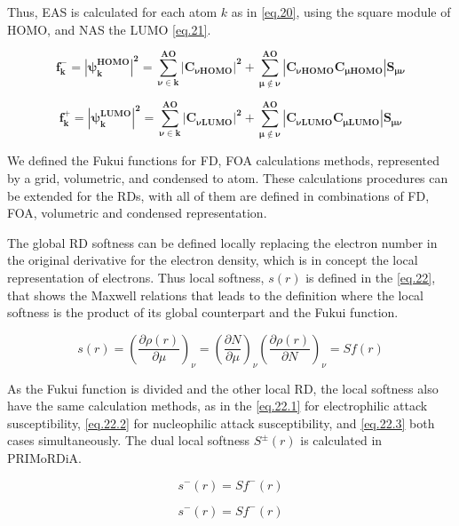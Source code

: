 \documentclass[a4paper,11pt]{refart}
\begin{document}
Thus, EAS is calculated for each atom $k$ as in \autoref{eq.20}, using the square module of HOMO, and NAS the LUMO \autoref{eq.21}. 

\begin{equation}
\mathbf{f^-_k =|\psi^{HOMO}_k|^2 =  \sum_{\nu \in k}^{AO} |C_{\nu HOMO}|^{2} + \sum_{\mu \notin \nu }^{AO} |C_{\nu HOMO} C_{\mu HOMO}|S_{\mu \nu}}
\label{eq.20}
\end{equation}

\begin{equation}
\mathbf{f^+_k = |\psi^{LUMO}_k|^2 = \sum_{\nu \in k}^{AO} |C_{\nu LUMO}|^{2} + \sum_{\mu \notin \nu }^{AO} |C_{\nu LUMO} C_{\mu LUMO}|S_{\mu \nu} }
\label{eq.21}
\end{equation}

We defined the Fukui functions for FD, FOA calculations methods, represented by a grid, volumetric, and condensed to atom. These calculations procedures can be extended for the RDs, with all of them are defined in combinations of FD, FOA, volumetric and condensed representation.   


The global RD softness can be defined locally replacing the electron number in the original derivative for the electron density, which is in concept the local representation of electrons. Thus local softness, $s(r)$ is defined in the \autoref{eq.22}, that shows the Maxwell relations that leads to the definition where the local softness is the product of its global counterpart and the Fukui function. 

\begin{equation}
s(r)= \left(\frac{\partial \rho(r)}{\partial \mu} \right)_\nu =
\left(\frac{\partial N}{\partial \mu}\right)_\nu
\left(\frac{\partial \rho(r)}{\partial N} \right)_\nu = Sf(r)
\label{eq.22}
\end{equation}

As the Fukui function is divided and the other local RD, the local softness also have the same calculation methods, as in the \autoref{eq.22.1} for electrophilic attack susceptibility,  \autoref{eq.22.2} for nucleophilic attack susceptibility, and \autoref{eq.22.3} both cases simultaneously. The dual local softness $S^{\pm}(r)$ is calculated in PRIMoRDiA.   

\begin{equation}
s^-(r) = Sf^-(r)
\label{eq.22.1}
\end{equation}

\begin{equation}
s^-(r) = Sf^-(r)
\label{eq.22.2}
\end{equation}
\end{document}
